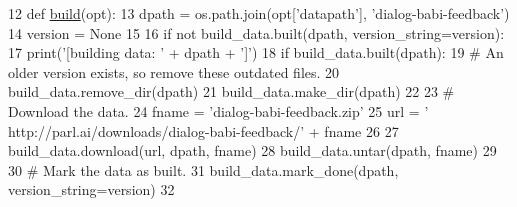 \begin{DoxyCode}
12 \textcolor{keyword}{def }\hyperlink{namespacedialog__babi__feedback_1_1build_a7a9d289f7493a5ded13c4b7f071b6184}{build}(opt):
13     dpath = os.path.join(opt[\textcolor{stringliteral}{'datapath'}], \textcolor{stringliteral}{'dialog-babi-feedback'})
14     version = \textcolor{keywordtype}{None}
15 
16     \textcolor{keywordflow}{if} \textcolor{keywordflow}{not} build\_data.built(dpath, version\_string=version):
17         print(\textcolor{stringliteral}{'[building data: '} + dpath + \textcolor{stringliteral}{']'})
18         \textcolor{keywordflow}{if} build\_data.built(dpath):
19             \textcolor{comment}{# An older version exists, so remove these outdated files.}
20             build\_data.remove\_dir(dpath)
21         build\_data.make\_dir(dpath)
22 
23         \textcolor{comment}{# Download the data.}
24         fname = \textcolor{stringliteral}{'dialog-babi-feedback.zip'}
25         url = \textcolor{stringliteral}{' http://parl.ai/downloads/dialog-babi-feedback/'} + fname
26 
27         build\_data.download(url, dpath, fname)
28         build\_data.untar(dpath, fname)
29 
30         \textcolor{comment}{# Mark the data as built.}
31         build\_data.mark\_done(dpath, version\_string=version)
32 \end{DoxyCode}
